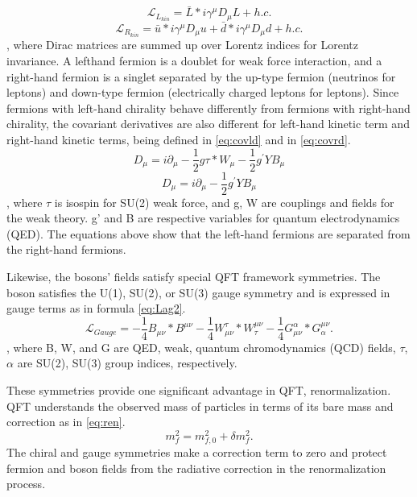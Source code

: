 \begin{equation}
\label{eq:Lag1}
	\mathcal{L}_{L_{kin}}  = \bar{L}*i\gamma^{\mu}D_{\mu}L+h.c.
\end{equation}
\begin{equation}
\label{eq:Lagr1}
	\mathcal{L}_{R_{kin}}  = \bar{u}*i\gamma^{\mu}D_{\mu}u+\bar{d}*i\gamma^{\mu}D_{\mu}d+h.c.
\end{equation}
, where Dirac matrices are summed up over Lorentz indices for Lorentz invariance. A lefthand fermion is a doublet for weak force interaction, and a right-hand fermion is a singlet separated by the up-type fermion (neutrinos for leptons) and down-type fermion (electrically charged leptons for leptons).
Since fermions with left-hand chirality behave differently from fermions with right-hand chirality,
the covariant derivatives are also different for left-hand kinetic term and right-hand kinetic terms, being defined in \ref{eq:covld} and in \ref{eq:covrd}.
\begin{equation}
\label{eq:covld}
	D_{\mu}  = i\partial_{\mu}-\frac{1}{2}g\tau*W_{\mu}-\frac{1}{2}g^{'}YB_{\mu} 
\end{equation}
\begin{equation}
\label{eq:covrd}
	D_{\mu}  = i\partial_{\mu}-\frac{1}{2}g^{'}YB_{\mu} 
\end{equation}
, where $\tau$ is isospin for SU(2) weak force, and g, W are couplings and fields for the weak theory. g' and B are respective variables for quantum electrodynamics (QED).
The equations above show that the left-hand fermions are separated from the right-hand fermions.


Likewise, the bosons' fields satisfy special QFT framework symmetries.
The boson satisfies the U(1), SU(2), or SU(3) gauge symmetry and is expressed in gauge terms as in formula \ref{eq:Lag2}.
\begin{equation}
\label{eq:Lag2}
	\mathcal{L}_{Gauge} = -\frac{1}{4}B_{\mu\nu}*B^{\mu\nu}-\frac{1}{4}W_{\mu\nu}^{\tau}*W^{\mu\nu}_{\tau}-\frac{1}{4}G_{\mu\nu}^{\alpha}*G^{\mu\nu}_{\alpha}.
\end{equation}
, where B, W, and G are QED, weak, quantum chromodynamics (QCD) fields, $\tau$, $\alpha$ are SU(2), SU(3) group indices, respectively.

These symmetries provide one significant advantage in QFT, renormalization.
QFT understands the observed mass of particles in terms of its bare mass and correction as in \ref{eq:ren}.
\begin{equation}
\label{eq:ren}
	m_{f}^{2}=m_{f,0}^{2}+\delta m_{f}^2.
\end{equation}
The chiral and gauge symmetries make a correction term to zero and protect fermion and boson fields from the radiative correction in the renormalization process.


